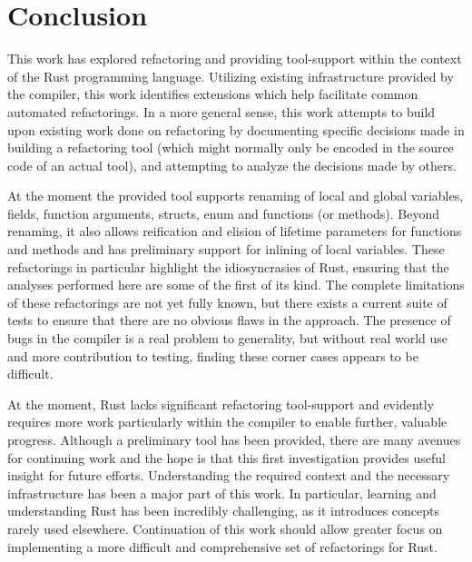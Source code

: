 \section{Conclusion}\label{C:con}
This work has explored refactoring and providing tool-support within the context of the Rust programming language. Utilizing existing infrastructure provided by the compiler, this work identifies extensions which help facilitate common automated refactorings. In a more general sense, this work attempts to build upon existing work done on refactoring by documenting specific decisions made in building a refactoring tool (which might normally only be encoded in the source code of an actual tool), and attempting to analyze the decisions made by others.


At the moment the provided tool supports renaming of local and global variables, fields, function arguments, structs, enum and functions (or methods). Beyond renaming, it also allows reification and elision of lifetime parameters for functions and methods and has preliminary support for inlining of local variables. These refactorings in particular highlight the idiosyncrasies of Rust, ensuring that the analyses performed here are some of the first of its kind. The complete limitations of these refactorings are not yet fully known, but there exists a current suite of tests to ensure that there are no obvious flaws in the approach. The presence of bugs in the compiler is a real problem to generality, but without real world use and more contribution to testing, finding these corner cases appears to be difficult.

At the moment, Rust lacks significant refactoring tool-support and evidently requires more work particularly within the compiler to enable further, valuable progress. Although a preliminary tool has been provided, there are many avenues for continuing work and the hope is that this first investigation provides useful insight for future efforts. Understanding the required context and the necessary infrastructure has been a major part of this work. In particular, learning and understanding Rust has been incredibly challenging, as it introduces concepts rarely used elsewhere. Continuation of this work should allow greater focus on implementing a more difficult and comprehensive set of refactorings for Rust.
